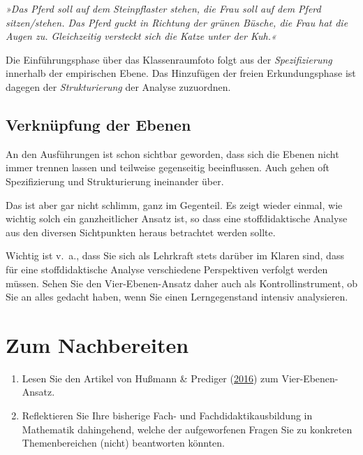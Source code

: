 \documentclass[
]{scrbook}
\providecommand{\tightlist}{%
  \setlength{\itemsep}{0pt}\setlength{\parskip}{0pt}}
\theoremstyle{definition}
\theoremstyle{definition}
\theoremstyle{definition}
\theoremstyle{definition}
\theoremstyle{remark}
\begin{document}
\emph{»Das Pferd soll auf dem Steinpflaster stehen, die Frau soll auf dem Pferd sitzen/stehen. Das Pferd guckt in Richtung der grünen Büsche, die Frau hat die Augen zu. Gleichzeitig versteckt sich die Katze unter der Kuh.«}

Die Einführungsphase über das Klassenraumfoto folgt aus der \emph{Spezifizierung} innerhalb der empirischen Ebene. Das Hinzufügen der freien Erkundungsphase ist dagegen der \emph{Strukturierung} der Analyse zuzuordnen.

\hypertarget{verknuxfcpfung-der-ebenen}{%
\subsection{Verknüpfung der Ebenen}\label{verknuxfcpfung-der-ebenen}}

An den Ausführungen ist schon sichtbar geworden, dass sich die Ebenen nicht immer trennen lassen und teilweise gegenseitig beeinflussen. Auch gehen oft Spezifizierung und Strukturierung ineinander über.

Das ist aber gar nicht schlimm, ganz im Gegenteil. Es zeigt wieder einmal, wie wichtig solch ein ganzheitlicher Ansatz ist, so dass eine stoffdidaktische Analyse aus den diversen Sichtpunkten heraus betrachtet werden sollte.

Wichtig ist v.~a., dass Sie sich als Lehrkraft stets darüber im Klaren sind, dass für eine stoffdidaktische Analyse verschiedene Perspektiven verfolgt werden müssen. Sehen Sie den Vier-Ebenen-Ansatz daher auch als Kontrollinstrument, ob Sie an alles gedacht haben, wenn Sie einen Lerngegenstand intensiv analysieren.

\hypertarget{vier-ebenen-nachbereitung}{%
\section{Zum Nachbereiten}\label{vier-ebenen-nachbereitung}}

\begin{enumerate}
\def\labelenumi{\arabic{enumi}.}
\tightlist
\item
  Lesen Sie den Artikel von Hußmann \& Prediger (\protect\hyperlink{ref-Hussmann:2016}{2016}) zum Vier-Ebenen-Ansatz.
\item
  Reflektieren Sie Ihre bisherige Fach- und Fachdidaktikausbildung in Mathematik dahingehend, welche der aufgeworfenen Fragen Sie zu konkreten Themenbereichen (nicht) beantworten könnten.
\end{enumerate}
\end{document}
